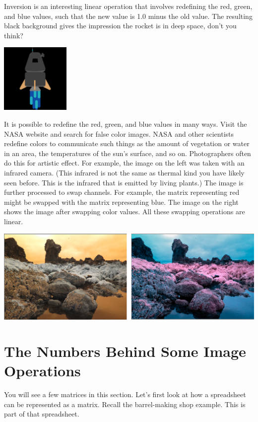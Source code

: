 Inversion is an interesting linear operation that involves redefining the red, green, and blue values, such that the new value is 1.0 minus the old value. The resulting black background gives the impression the rocket is in deep space, don't you think?

\includegraphics[width=0.25\textwidth]{rocket-inverted.png}

It is possible to redefine the red, green, and blue values in many ways. Visit the NASA website and search for false color images. NASA and other scientists redefine colors to communicate such things as the amount of vegetation or water in an area, the temperatures of the sun's surface, and so on. Photographers often do this for artistic effect. For example, the image on the left was taken with an infrared camera. (This infrared is not the same as thermal kind you have likely seen before. This is the infrared that is emitted by living plants.) The image is further processed to swap channels. For example, the matrix representing red might be swapped with the matrix representing blue. The image on the right shows the image after swapping color values. All these swapping operations are linear.

\includegraphics[width=1.0\textwidth]{infrared.png}

\section{The Numbers Behind Some Image Operations}

You will see a few matrices in this section. Let's first look at how a spreadsheet can be represented as a matrix. Recall the barrel-making shop example. This is part of that spreadsheet. 

